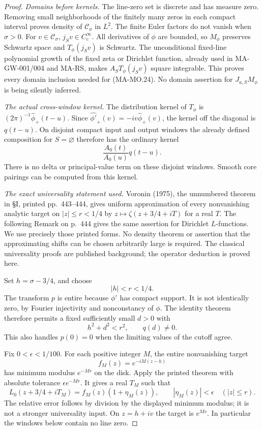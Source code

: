 \begin{proof}
\emph{Domains before kernels.}
The line-zero set is discrete and has measure zero.
Removing small neighborhoods of the finitely many zeros
in each compact interval proves density of
\(\mathscr C_\sigma\) in \(L^2\).
The finite Euler factors do not vanish when \(\sigma>0\).
For \(v\in\mathscr C_\sigma\), \(j_Sv\in C_c^\infty\).
All derivatives of \(\phi\) are bounded, so \(M_\phi\)
preserves Schwartz space and \(T_\phi(j_Sv)\) is Schwartz.
The unconditional fixed-line polynomial growth of the
fixed zeta or Dirichlet function, already used in
MA-GW-001/004 and MA-RS, makes
\(A_ST_\phi(j_Sv)\) square integrable.
This proves every domain inclusion needed for (MA-MO.24).
No domain assertion for \(J_{a,S}M_\phi\) is being
silently inferred.

\emph{The actual cross-window kernel.}
The distribution kernel of \(T_\phi\) is
\((2\pi)^{-1}\widehat\phi_+(t-u)\).
Since \(\widehat{\phi'}_+(v)=-iv\widehat\phi_+(v)\),
the kernel off the diagonal is \(q(t-u)\).
On disjoint compact input and output windows the
already defined composition for \(S=\varnothing\)
therefore has the ordinary kernel
\[
                      \frac{A_0(t)}{A_0(u)}q(t-u).
 \tag{MA-MO.26}
\]
There is no delta or principal-value term on these
disjoint windows. Smooth core pairings can be computed
from this kernel.

\emph{The exact universality statement used.}
Voronin (1975), the unnumbered theorem in \S I,
printed pp.~443--444, gives uniform approximation of
every nonvanishing analytic target on \(|z|\le r<1/4\)
by \(z\mapsto\zeta(z+3/4+iT)\) for a real \(T\).
The following Remark on p.~444 gives the same assertion
for Dirichlet \(L\)-functions.
We use precisely those printed forms. No density
theorem or assertion that the approximating shifts
can be chosen arbitrarily large is required.
The classical universality proofs are published
background; the operator deduction is proved here.

Set \(h=\sigma-3/4\), and choose
\[
                      |h|<r<1/4 .
 \tag{MA-MO.27}
\]
The transform \(p\) is entire because \(\phi'\) has
compact support. It is not identically zero, by Fourier
injectivity and nonconstancy of \(\phi\).
The identity theorem therefore permits a fixed
sufficiently small \(d>0\) with
\[
                         h^2+d^2<r^2,\qquad q(d)\ne0.
 \tag{MA-MO.28}
\]
This also handles \(p(0)=0\) when the limiting values
of the cutoff agree.

Fix \(0<\epsilon<1/100\). For each positive integer \(M\),
the entire nonvanishing target
\[
                         f_M(z)=e^{-iM(z-h)}
 \tag{MA-MO.29}
\]
has minimum modulus \(e^{-Mr}\) on the disk.
Apply the printed theorem with absolute tolerance
\(\epsilon e^{-Mr}\). It gives a real \(T_M\) such that
\[
 L_0(z+3/4+iT_M)=f_M(z)(1+\eta_M(z)),\qquad
        |\eta_M(z)|<\epsilon\quad(|z|\le r).
 \tag{MA-MO.30}
\]
The relative error follows by division by the
displayed minimum modulus; it is not a stronger
universality input. On \(z=h+iv\) the target is \(e^{Mv}\).
In particular the windows below contain no line zero.


\end{proof}
